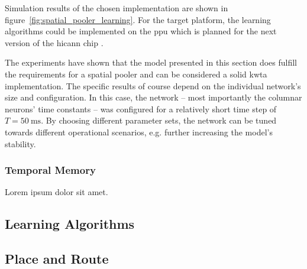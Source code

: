 \begin{figure*}
	\begin{center}
		
	\end{center}
	\caption{Dependency of output and input overlap for a trained spatial pooler. Results of five independent simulation runs are shown as well as reference data from a custom software implementation.}
	\label{fig:spatial_pooler_learning}
\end{figure*}

Simulation results of the chosen implementation are shown in figure~\ref{fig:spatial_pooler_learning}. For the target platform, the learning algorithms could be implemented on the \gls{ppu} which is planned for the next version of the \gls{hicann} chip \citep{friedmann2013phd}.

The experiments have shown that the model presented in this section does fulfill the requirements for a spatial pooler and can be considered a solid \gls{kwta} implementation. The specific results of course depend on the individual network's size and configuration. In this case, the network -- most importantly the columnar neurons' time constants -- was configured for a relatively short time step of $T = \SI{50}{\milli\second}$. By choosing different parameter sets, the network can be tuned towards different operational scenarios, e.g. further increasing the model's stability.

\subsubsection{Temporal Memory}

Lorem ipsum dolor sit amet.

\begin{figure*}
	\begin{center}
		
	\end{center}
	\caption{A \gls{lif} neuron based temporal memory implementation correctly predicting different patterns. Predicted cells are marked blue, active cells in purple. The network spans 128 columns with each of their eight \gls{htm} cells collecting distal stimuli via two dendritic segments. Connectivity for the distal inputs was configured externally. The model was presented three disjunct sequences of size three. The individual patterns were separated by a random input \gls{sdr}.}
	\label{fig:static_temporal_memory_live}
\end{figure*}

\subsection{Learning Algorithms}

\subsection{Place and Route}
